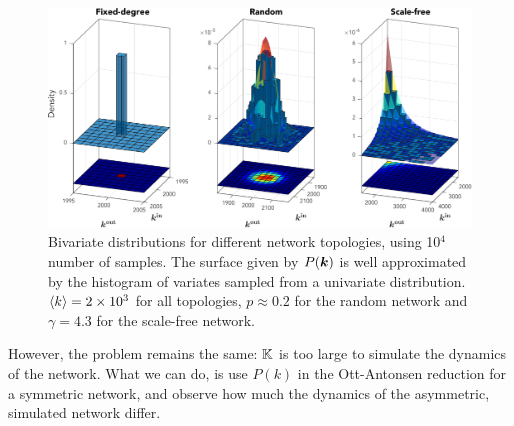 \begin{figure}[ht]
\centering
\includegraphics[width = \textwidth]{../Figures/Distributions/2D.pdf}
\caption{Bivariate distributions for different network topologies, using 10$^4$ number of samples. The surface given by $P({\boldsymbol{k}})$ is well approximated by the histogram of variates sampled from a univariate distribution. ${\langle k\rangle} =  2 \times 10^3$ for all topologies, $p \approx 0.2$ for the random network and $\gamma = 4.3$ for the scale-free network.}
\label{fig:2Ddistributions}
\end{figure}
However, the problem remains the same: ${\mathbb{K}}$ is too large to simulate the dynamics of the network. What we can do, is use $P(k)$ in the Ott-Antonsen reduction for a symmetric network, and observe how much the dynamics of the asymmetric, simulated network differ.

